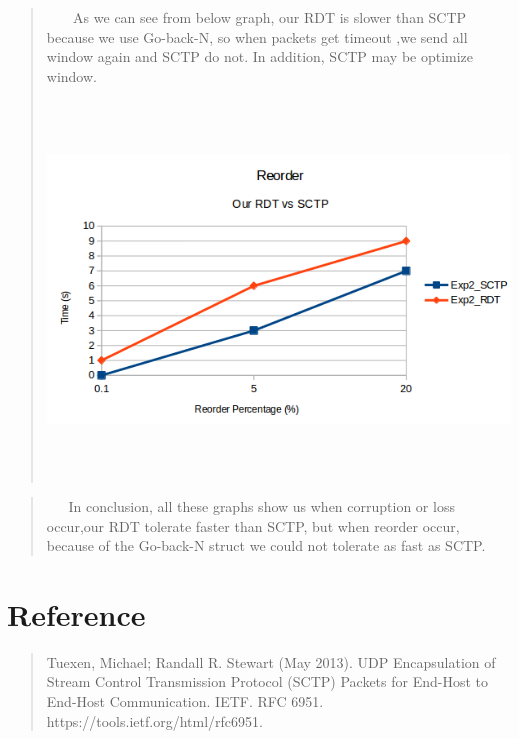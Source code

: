 \documentclass[12pt]{article}
\begin{document}
\begin{quote}
$\ \  \ \ \ \ \ $ As we can see from below graph, our RDT is slower than SCTP because we use Go-back-N, so when packets get timeout ,we send all window again and SCTP do not. In addition, SCTP may be optimize window.  



\includegraphics[width = 180mm, height = 100mm]{Reorder}
\end{quote}

\begin{quote}
\newpage
$\ \  \ \ \ \ \ $In conclusion, all these graphs show us when corruption or loss occur,our RDT tolerate faster than SCTP, but when reorder occur, because of the Go-back-N struct we could not tolerate as fast as  SCTP.
\end{quote}
\section*{Reference}

\begin{quote}
Tuexen, Michael; Randall R. Stewart (May 2013). UDP Encapsulation of Stream Control Transmission Protocol (SCTP) Packets for End-Host to End-Host Communication. IETF. RFC 6951. https://tools.ietf.org/html/rfc6951.
\end{quote}
\end{document}
